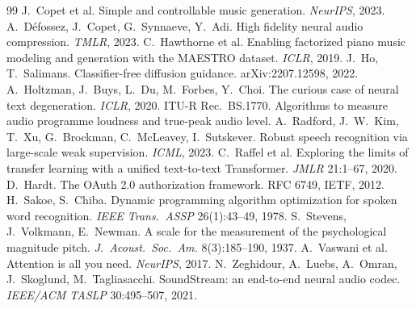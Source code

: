 \documentclass[10pt,twocolumn]{article}
\begin{document}
\footnotesize
\begin{thebibliography}{99}\setlength{\itemsep}{0pt}
 J.~Copet et al. Simple and controllable music generation. \emph{NeurIPS}, 2023.
 A.~D\'efossez, J.~Copet, G.~Synnaeve, Y.~Adi. High fidelity neural audio compression. \emph{TMLR}, 2023.
 C.~Hawthorne et al. Enabling factorized piano music modeling and generation with the MAESTRO dataset. \emph{ICLR}, 2019.
 J.~Ho, T.~Salimans. Classifier-free diffusion guidance. arXiv:2207.12598, 2022.
 A.~Holtzman, J.~Buys, L.~Du, M.~Forbes, Y.~Choi. The curious case of neural text degeneration. \emph{ICLR}, 2020.
 ITU-R Rec.\ BS.1770. Algorithms to measure audio programme loudness and true-peak audio level.
 A.~Radford, J.~W.~Kim, T.~Xu, G.~Brockman, C.~McLeavey, I.~Sutskever. Robust speech recognition via large-scale weak supervision. \emph{ICML}, 2023.
 C.~Raffel et al. Exploring the limits of transfer learning with a unified text-to-text Transformer. \emph{JMLR} 21:1--67, 2020.
 D.~Hardt. The OAuth 2.0 authorization framework. RFC 6749, IETF, 2012.
 H.~Sakoe, S.~Chiba. Dynamic programming algorithm optimization for spoken word recognition. \emph{IEEE Trans.\ ASSP} 26(1):43--49, 1978.
 S.~Stevens, J.~Volkmann, E.~Newman. A scale for the measurement of the psychological magnitude pitch. \emph{J.\ Acoust.\ Soc.\ Am.} 8(3):185--190, 1937.
 A.~Vaswani et al. Attention is all you need. \emph{NeurIPS}, 2017.
 N.~Zeghidour, A.~Luebs, A.~Omran, J.~Skoglund, M.~Tagliasacchi. SoundStream: an end-to-end neural audio codec. \emph{IEEE/ACM TASLP} 30:495--507, 2021.
\end{thebibliography}
\end{document}
